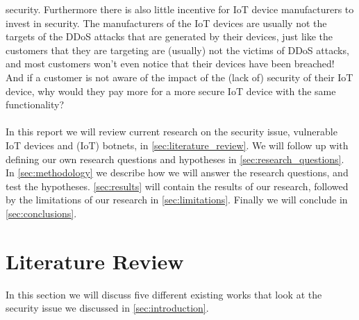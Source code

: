 \documentclass[a4paper,10pt]{article}
\begin{document}
security. Furthermore there is also little incentive for IoT device manufacturers to invest in security. The manufacturers 
of the IoT devices are usually not the targets of the DDoS attacks that are generated by their devices, just like the 
customers that they are targeting are (usually) not the victims of DDoS attacks, and most customers won't even notice
that their devices have been breached! And if a customer is not aware of the impact of the (lack of) security of their IoT device,
why would they pay more for a more secure IoT device with the same functionality?
\\\\
In this report we will review current research on the security issue, vulnerable IoT devices and (IoT) botnets, in \autoref{sec:literature_review}. We will follow up with
defining our own research questions and hypotheses in \autoref{sec:research_questions}. In \autoref{sec:methodology} we
describe how we will answer the research questions, and test the hypotheses. \autoref{sec:results} will contain the results
of our research, followed by the limitations of our research in \autoref{sec:limitations}. Finally we will conclude in 
\autoref{sec:conclusions}.

\section{Literature Review} \label{sec:literature_review}
% 
In this section we will discuss five different existing works that look at the security issue we discussed in 
\autoref{sec:introduction}. 
\end{document}
